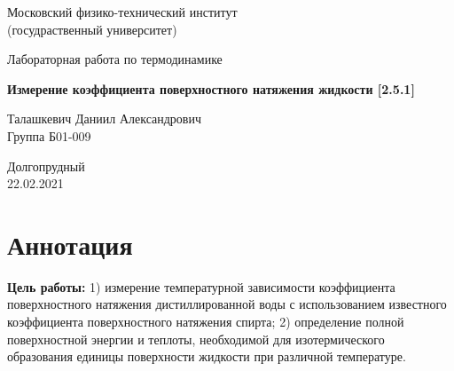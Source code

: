 \documentclass[a4paper,11.5pt]{article} %
\begin{document}


\begin{titlepage}

\newpage
\begin{center}
\normalsize Московский физико-технический институт \\(госудраственный университет)
\end{center}

\vspace{6em}

\begin{center}
\Large Лабораторная работа по термодинамике\\
\end{center}

\vspace{1em}

\begin{center}
\large \textbf{Измерение коэффициента поверхностного натяжения жидкости [2.5.1]}
\end{center}

\vspace{2em}

\begin{center}
\large Талашкевич Даниил Александрович\\
Группа Б01-009
\end{center}

\vspace{\fill}

\begin{center}
Долгопрудный \\22.02.2021
\end{center}

\end{titlepage}



\thispagestyle{empty}
\newpage
\tableofcontents
\newpage
\setcounter{page}{1}



\section{Аннотация}
\textbf{Цель работы:} 1) измерение температурной зависимости коэффициента поверхностного натяжения дистиллированной воды с использованием известного коэффициента поверхностного натяжения спирта; 2) определение полной поверхностной энергии и теплоты, необходимой для изотермического образования единицы поверхности жидкости при различной температуре.
\end{document}
